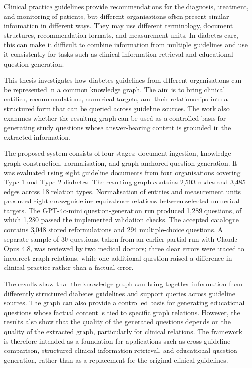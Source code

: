 Clinical practice guidelines provide recommendations for the diagnosis, treatment, and monitoring of patients, but different organisations often present similar information in different ways. They may use different terminology, document structures, recommendation formats, and measurement units. In diabetes care, this can make it difficult to combine information from multiple guidelines and use it consistently for tasks such as clinical information retrieval and educational question generation.

This thesis investigates how diabetes guidelines from different organisations can be represented in a common knowledge graph. The aim is to bring clinical entities, recommendations, numerical targets, and their relationships into a structured form that can be queried across guideline sources. The work also examines whether the resulting graph can be used as a controlled basis for generating study questions whose answer-bearing content is grounded in the extracted information.

The proposed system consists of four stages: document ingestion, knowledge graph construction, normalisation, and graph-anchored question generation. It was evaluated using eight guideline documents from four organisations covering Type 1 and Type 2 diabetes. The resulting graph contains 2,503 nodes and 3,485 edges across 18 relation types. Normalisation of entities and measurement units produced eight cross-guideline equivalence relations between selected numerical targets. The GPT-4o-mini question-generation run produced 1,289 questions, of which 1,280 passed the implemented validation checks. The accepted catalogue contains 3,048 stored reformulations and 294 multiple-choice questions. A separate sample of 30 questions, taken from an earlier partial run with
Claude Opus 4.8, was reviewed by two medical doctors; three clear errors were traced to incorrect graph relations, while one additional question raised a difference in clinical practice rather than a factual error.

The results show that the knowledge graph can bring together information from differently structured diabetes guidelines and support queries across guideline sources. The graph can also provide a controlled basis for generating educational questions whose factual content is tied to specific graph relations. However, the results also show that the quality of the generated questions depends on the quality of the extracted graph, particularly for clinical relations. The framework is therefore intended as a foundation for applications such as cross-guideline comparison, structured clinical information retrieval, and educational question generation, rather than as a replacement for the original clinical guidelines.
